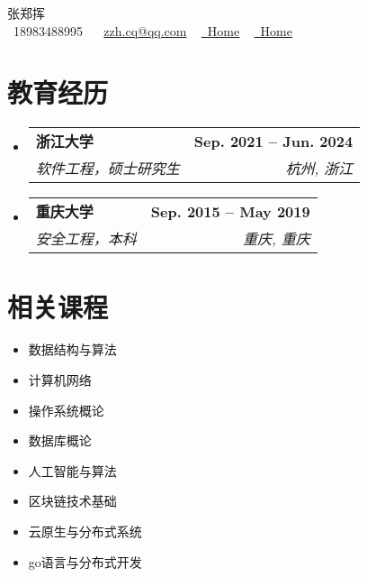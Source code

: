 \documentclass[letterpaper,11pt]{ctexart}
\makeatletter
\newcommand{\resumeSubheading}[4]{
  \vspace{-2pt}\item
    \begin{tabular*}{1.0\textwidth}[t]{l@{\extracolsep{\fill}}r}
      \textbf{#1} & \textbf{\small #2} \\
      \textit{\small#3} & \textit{\small #4} \\
    \end{tabular*}\vspace{-7pt}
}
\newcommand{\resumeSubHeadingListStart}{\begin{itemize}[leftmargin=0.0in, label={}]}
\newcommand{\resumeSubHeadingListEnd}{\end{itemize}}
\makeatother
\begin{document}

\begin{center}
    {\Huge \scshape 张郑挥} \\ \vspace{1pt}
    \vspace{1pt}
    \small \raisebox{-0.1\height}\faPhone\ 18983488995 ~ \raisebox{-0.2\height}\faEnvelope\  \underline{zzh.cq@qq.com} ~
    \href{https://linkedin.com/in/kevin-zhang-95245521b/}{\raisebox{-0.2\height}\faLinkedin\ \underline{Home}}  ~
    \href{https://github.com/kevin-zhangzh}{\raisebox{-0.2\height}\faGithub\ \underline{Home}}
    \vspace{-8pt}
\end{center}


\section{教育经历}
  \resumeSubHeadingListStart
    \resumeSubheading
      {浙江大学}{Sep. 2021 -- Jun. 2024}
      {软件工程，硕士研究生}{杭州, 浙江}
    \resumeSubheading
      {重庆大学}{Sep. 2015 -- May 2019}
      {安全工程，本科}{重庆, 重庆}
  \resumeSubHeadingListEnd

\section{相关课程}
       \begin{multicols}{4}
           \begin{itemize}[itemsep=-5pt, parsep=3pt]
               \item 数据结构与算法
               \item 计算机网络
               \item 操作系统概论
               \item 数据库概论
               \item 人工智能与算法
               \item 区块链技术基础
               \item 云原生与分布式系统
               \item go语言与分布式开发
           \end{itemize}
       \end{multicols}
       \vspace*{2.0\multicolsep}
\end{document}
